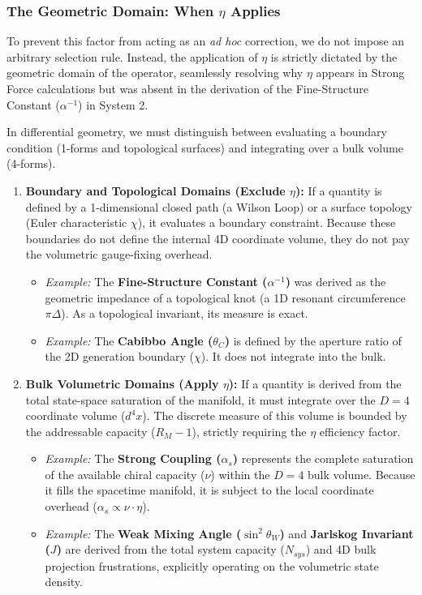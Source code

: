 \subsubsection{The Geometric Domain: When \texorpdfstring{$\eta$}{eta} Applies}

To prevent this factor from acting as an \textit{ad hoc} correction, we do not impose an arbitrary selection rule. Instead, the application of $\eta$ is strictly dictated by the geometric domain of the operator, seamlessly resolving why $\eta$ appears in Strong Force calculations but was absent in the derivation of the Fine-Structure Constant ($\alpha^{-1}$) in System 2.

In differential geometry, we must distinguish between evaluating a boundary condition (1-forms and topological surfaces) and integrating over a bulk volume (4-forms).

\begin{enumerate}
    \item \textbf{Boundary and Topological Domains (Exclude $\eta$):} If a quantity is defined by a 1-dimensional closed path (a Wilson Loop) or a surface topology (Euler characteristic $\chi$), it evaluates a boundary constraint. Because these boundaries do not define the internal 4D coordinate volume, they do not pay the volumetric gauge-fixing overhead. 
    \begin{itemize}
        \item \textit{Example:} The \textbf{Fine-Structure Constant ($\alpha^{-1}$)} was derived as the geometric impedance of a topological knot (a 1D resonant circumference $\pi\Delta$). As a topological invariant, its measure is exact.
        \item \textit{Example:} The \textbf{Cabibbo Angle ($\theta_C$)} is defined by the aperture ratio of the 2D generation boundary ($\chi$). It does not integrate into the bulk.
    \end{itemize}

    \item \textbf{Bulk Volumetric Domains (Apply $\eta$):} If a quantity is derived from the total state-space saturation of the manifold, it must integrate over the $D=4$ coordinate volume ($d^4x$). The discrete measure of this volume is bounded by the addressable capacity ($R_M - 1$), strictly requiring the $\eta$ efficiency factor.
    \begin{itemize}
        \item \textit{Example:} The \textbf{Strong Coupling ($\alpha_s$)} represents the complete saturation of the available chiral capacity ($\nu$) within the $D=4$ bulk volume. Because it fills the spacetime manifold, it is subject to the local coordinate overhead ($\alpha_s \propto \nu \cdot \eta$).
        \item \textit{Example:} The \textbf{Weak Mixing Angle ($\sin^2\theta_W$)} and \textbf{Jarlskog Invariant ($J$)} are derived from the total system capacity ($N_{sys}$) and 4D bulk projection frustrations, explicitly operating on the volumetric state density.
    \end{itemize}
\end{enumerate}

